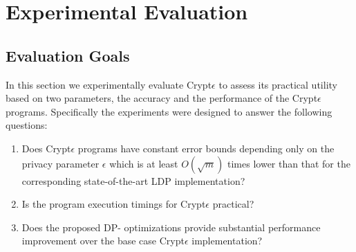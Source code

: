 \section{Experimental Evaluation}
\subsection{Evaluation Goals}
In this section we experimentally evaluate  Crypt$\epsilon$ to assess its practical utility  based on two parameters, the accuracy and the performance of the Crypt$\epsilon$ programs. Specifically the experiments were designed to answer the following questions:
\begin{enumerate}\item Does Crypt$\epsilon$ programs have constant error bounds depending only on the privacy parameter $\epsilon$  which is at least $O(\sqrt{m})$ times lower than that for the corresponding state-of-the-art LDP implementation? \item Is the program execution timings for Crypt$\epsilon$ practical? \item Does the proposed DP- optimizations provide substantial performance improvement over the base case Crypt$\epsilon$ implementation? \end{enumerate}
